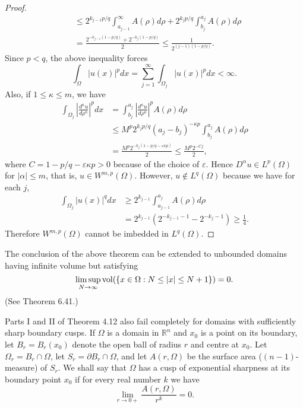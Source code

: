 \begin{proof}
\[\begin{aligned}
  & \leq 2^{k_{j-1} p / q} \int_{a_{j-1}}^{\infty} A(\rho) d \rho+2^{k_j p / q} \int_{b_j}^{a_j} A(\rho) d \rho \\
  & =\frac{2^{-k_{j-1}(1-p / q)}+2^{-k_j(1-p / q)}}{2} \leq \frac{1}{2^{(j-1)(1-p / q)}} .
  \end{aligned}
  \]
  Since $p<q$, the above inequality forces
  \[
  \int_{\Omega}|u(x)|^p d x=\sum_{j=1}^{\infty} \int_{\Omega_j}|u(x)|^p d x<\infty .
  \]
  Also, if $1 \leq \kappa \leq m$, we have
  \[
  \begin{aligned}
  \int_{\Omega_j}\left|\frac{d^\kappa u}{d \rho^\kappa}\right|^p d x & =\int_{b_j}^{a_j}\left|\frac{d^\kappa u}{d \rho^\kappa}\right|^p A(\rho) d \rho \\
  & \leq M^p 2^{k_j p / q}\left(a_j-b_j\right)^{-\kappa p} \int_{b_j}^{a_j} A(\rho) d \rho \\
  & =\frac{M^p 2^{-k_j(1-p / q-\varepsilon \kappa p)}}{2} \leq \frac{M^p 2^{-C j}}{2},
  \end{aligned}
  \]
  where $C=1-p / q-\varepsilon \kappa p>0$ because of the choice of $\varepsilon$. Hence $D^\alpha u \in L^p(\Omega)$ for $|\alpha| \leq m$, that is, $u \in W^{m,p}(\Omega)$. However, $u \notin L^q(\Omega)$ because we have for each $j$,
  \[
  \begin{aligned}
  \int_{\Omega_j}|u(x)|^q d x & \geq 2^{k_{j-1}} \int_{a_{j-1}}^{a_j} A(\rho) d \rho \\
  & =2^{k_{j-1}}\left(2^{-k_{j-1}-1}-2^{-k_j-1}\right) \geq \frac{1}{4} .
  \end{aligned}
  \]
  Therefore $W^{m,p}(\Omega)$ cannot be imbedded in $L^q(\Omega)$.
\end{proof}

The conclusion of the above theorem can be extended to unbounded domains having infinite volume but satisfying
\[\limsup_{N \rightarrow \infty} \operatorname{vol}(\{x \in \Omega: N \leq|x| \leq N+1\})=0.\]
(See Theorem 6.41.)

\begin{para}
  Parts I and II of Theorem 4.12 also fail completely for domains with sufficiently sharp boundary cusps. 
  If $\Omega$ is a domain in $\mathbb{R}^n$ and $x_0$ is a point on its boundary,
  let $B_r=B_r\left(x_0\right)$ denote the open ball of radius $r$ and centre at $x_0$.
  Let $\Omega_r=B_r \cap \Omega$, let $S_r = \partial B_r \cap \Omega$,
  and let $A(r, \Omega)$ be the surface area ($(n-1)$-measure) of $S_r$.
  We shall say that $\Omega$ has a cusp of exponential sharpness
  at its boundary point $x_0$ if for every real number $k$ we have
  \begin{equation}\label{eq:4.25}
    \lim_{r\to 0+} \frac{A(r, \Omega)}{r^k} = 0.
  \end{equation}
\end{para}

